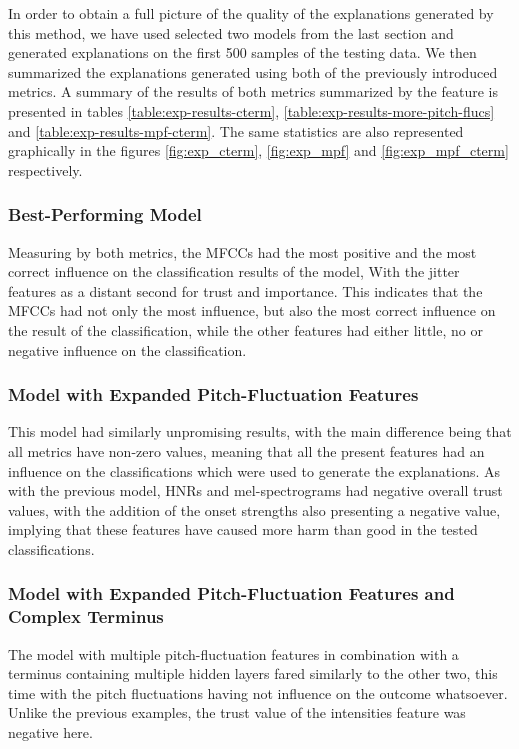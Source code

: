 \documentclass{article}
\begin{document}
		In order to obtain a full picture of the quality of the explanations generated by this
		method, we have used selected two models from the last section and generated explanations
		on the first 500 samples of the testing data. We then summarized the explanations generated
		using both of the previously introduced metrics. A summary of the results of both metrics
		summarized by the feature is presented in tables \ref{table:exp-results-cterm},
		\ref{table:exp-results-more-pitch-flucs} and \ref{table:exp-results-mpf-cterm}. The same
		statistics are also represented graphically in the figures \ref{fig:exp_cterm},
		\ref{fig:exp_mpf} and \ref{fig:exp_mpf_cterm} respectively.
		\subsubsection{Best-Performing Model}
		Measuring by both metrics, the MFCCs had the most positive and the most correct influence
		on the classification results of the model, With the jitter features as a distant second
		for trust and importance. This indicates that the MFCCs had not only the most influence,
		but also the most correct influence on the result of the classification, while the other
		features had either little, no or negative influence on the classification.
		\subsubsection{Model with Expanded Pitch-Fluctuation Features}
		This model had similarly unpromising results, with the main difference being that all
		metrics have non-zero values, meaning that all the present features had an influence on
		the classifications which were used to generate the explanations. As with the previous
		model, HNRs and mel-spectrograms had negative overall trust values, with the addition of
		the onset strengths also presenting a negative value, implying that these features have
		caused more harm than good in the tested classifications.
		\subsubsection{Model with Expanded Pitch-Fluctuation Features and Complex Terminus}
		The model with multiple pitch-fluctuation features in combination with a terminus
		containing multiple hidden layers fared similarly to the other two, this time with the
		pitch fluctuations having not influence on the outcome whatsoever. Unlike the previous
		examples, the trust value of the intensities feature was negative here.
\end{document}
